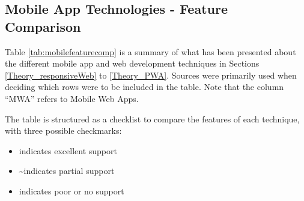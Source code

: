 \documentclass[a4paper,12pt]{article}
\newcommand{\cmark}{\ding{51}}
\newcommand{\xmark}{\ding{55}}
\begin{document}
\subsection{Mobile App Technologies - Feature Comparison}
\label{Theory_featureComparison}
Table \ref{tab:mobilefeaturecomp} is a summary of what has been presented about the different mobile app and web development techniques in Sections \ref{Theory_responsiveWeb} to \ref{Theory_PWA}. Sources \cite{mobile_web_apps_2013, dawning_of_pwa, pwa_in_modern_webdeb} were primarily used when deciding which rows were to be included in the table. Note that the column “MWA” refers to Mobile Web Apps.

The table is structured as a checklist to compare the features of each technique, with three possible checkmarks:

\begin{itemize}
    \item[] \cmark \quad indicates excellent support
    \item[] \textasciitilde \quad indicates partial support
    \item[] \xmark \quad indicates poor or no support
\end{itemize}
\end{document}

